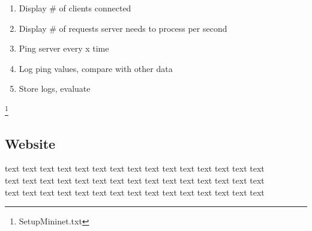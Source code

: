 \documentclass[12pt]{report}
\begin{document}
\begin{enumerate}
\item Display \# of clients connected
\item Display \# of requests server needs to process per second
\item Ping server every x time
\item Log ping values, compare with other data
\item Store logs, evaluate
\end{enumerate}

\footnote{SetupMininet.txt}  

\subsection*{Website}
text text text text text text text text text text text text text text text\\text text text text text text text text text text text text text text text\\text text text text text text text text text text text text text text text\\
\end{document}
